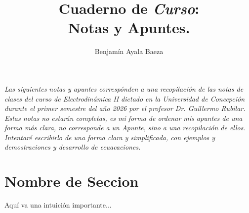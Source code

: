 \documentclass[twoside]{article}
\title{Cuaderno de \textit{Curso}:\\
Notas y Apuntes.
    }
\author{Benjamín Ayala Baeza}
\begin{document}
\maketitle

\emph{Las siguientes notas y apuntes correspónden a una recopilación de las notas de clases del curso de Electrodinámica II dictado en la Universidad de Concepción durante el primer semestre del año 2026 por el profesor Dr. Guillermo Rubilar. Estas notas no estarán completas, es mi forma de ordenar mis apuntes de una forma más clara, no corresponde a un Apunte, sino a una recopilación de ellos. 
Intentaré escribirlo de una forma clara y simplificada, con ejemplos y demostraciones y desarrollo de ecuacaciones.}

\tableofcontents
\newpage

\section{Nombre de Seccion}
\lipsum[1-4]

\begin{idea}
Aquí va una intuición importante...
\end{idea}
\end{document}
